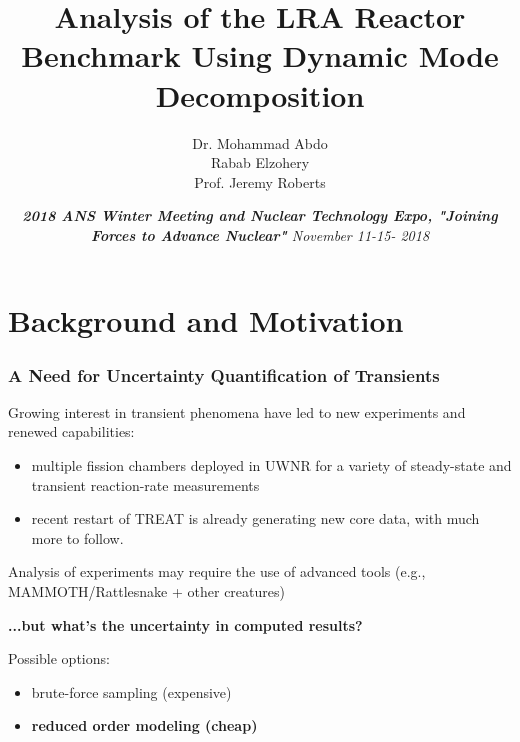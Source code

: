 \documentclass[fleqn]{beamer}
\title[]{
    Analysis of the LRA Reactor Benchmark Using Dynamic Mode Decomposition}
\author[]{
Dr. Mohammad Abdo \\
	       Rabab Elzohery \\
               Prof. Jeremy Roberts}
\institute[Kansas State University]{
    Mechanical and Nuclear Engineering \\
    Kansas State University}
\date[]{\emph{{\textbf{2018 ANS Winter Meeting and Nuclear Technology Expo, "Joining Forces to Advance Nuclear"}}
    November 11-15- 2018}}
\begin{document}
    \newcommand{\beginbackup}{
        \newcounter{framenumbervorappendix}
        \setcounter{framenumbervorappendix}{\value{framenumber}}
    }
    \newcommand{\backupend}{
        \addtocounter{framenumbervorappendix}{-\value{framenumber}}
        \addtocounter{framenumber}{\value{framenumbervorappendix}} 
    }
    
    \begin{frame}
        \titlepage
    \end{frame}
    

\section{Background and Motivation}
    
    
\begin{frame}
\frametitle{A Need for Uncertainty Quantification of Transients}       

\vfill

Growing interest in transient phenomena have led to new experiments and renewed capabilities:
\pause
\begin{itemize}
 \item multiple fission chambers deployed in UWNR for a variety of  steady-state and transient reaction-rate measurements
 \pause 
 \item recent restart of TREAT is already generating new core data, with much more to follow.
\end{itemize}

\vfill 
\pause 

Analysis of experiments may require the use of advanced tools (e.g., MAMMOTH/Rattlesnake + other creatures)

\pause 
\vfill

{\bf ...but what's the uncertainty in computed results?}
 
\pause 
\vfill

Possible options:
\begin{itemize}
 \item brute-force sampling (expensive)
 \item {\bf reduced order modeling (cheap)}
\end{itemize}
 
\vfill
 
\end{frame}
\end{document}
